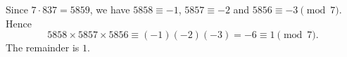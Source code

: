 Since $7\cdot837=5859$, we have $5858\equiv-1$, $5857\equiv-2$ and $5856\equiv-3\pmod 7$. Hence
\[5858\times5857\times5856\equiv(-1)(-2)(-3)=-6\equiv1\pmod7.\]
The remainder is $\boxed{1}$.
